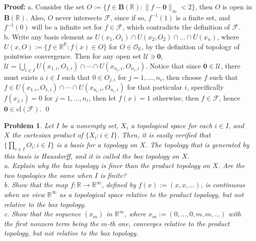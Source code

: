 \documentclass[12pt]{article}
\newtheorem{problem}{Problem}
\begin{document}
\textbf{Proof:} a. Consider the set $O:=\{f\in\textbf{B}(\mathbb{R}):\|f-\textbf{0}\|_{\infty}<2\}$, then $O$ is open in $\textbf{B}(\mathbb{R})$. Also, $O$ never intersects $\mathcal{F}$, since if so, $f^{-1}(1)$ is a finite set, and $f^{-1}(0)$ will be a infinite set for $f\in\mathcal{F}$, which contradicts the definition of $\mathcal{F}$. \\
\indent b. Write any basis element as $U(x_{1}, O_{1})\cap U(x_{2}, O_{2})\cap\dots\cap U(x_{n})$, where $U(x,O):= \{f\in\mathbb{R}^{\mathbb{R}}: f(x)\in O\}$ for $O\in\mathcal{O}_{\mathbb{R}}$, by the definition of topology of pointwise convergence. Then for any open set $\mathcal{U}\ni \textbf{0}$, $\mathcal{U}=\bigcup_{i\in I}U(x_{1,i}, O_{1, i})\cap\cdots\cap U(x_{n_{i}, i}, O_{n_{i}, i})$. Notice that since $\textbf{0}\in\mathcal{U}$, there must exists a $i\in I$ such that $0\in O_{j,i}$ for $j=1, \dots, n_{i}$, then choose $f$ such that $f\in U(x_{1,i}, O_{1, i})\cap\cdots\cap U(x_{n_{i}, i}, O_{n_{i}, i})$ for that particular $i$, specifically $f(x_{j, i})=0$ for $j=1, \dots, n_{i}$, then let $f(x)=1$ otherwise, then $f\in\mathcal{F}$, hence $\textbf{0}\in\text{cl}(\mathcal{F})$. \qed
\\
\begin{problem}
Let $I$ be a nonempty set, $X_{i}$ a topological space for each $i\in I$, and $X$ the cartesian product of $\{X_{i}: i\in I\}$. Then, it is easily verified that $\{\prod_{i\in I} O_{i}: i\in I\}$ is a basis for a topology on $X$. The topology that is generated by this basis is Hausdorff, and it is called the box topology on $X$. \\
\indent a. Explain why the box topology is finer than the product topology on $X$. Are the two topologies the same when $I$ is finite? \\
\indent b. Show that the map $f: \mathbb{R}\to\mathbb{R}^{\infty}$, defined by $f(x):= (x, x, \dots)$, is continuous when we view $\mathbb{R}^{\infty}$ as a topological space relative to the product topology, but not relative to the box topology. \\
\indent c. Show that the sequence $(x_{m})$ in $\mathbb{R}^{\infty}$, where $x_{m}:= (0, \dots, 0, m, m, \dots)$ with the first nonzero term being the $m$-th one, converges relative to the product topology, but not relative to the box topology.
\end{problem}
\end{document}
